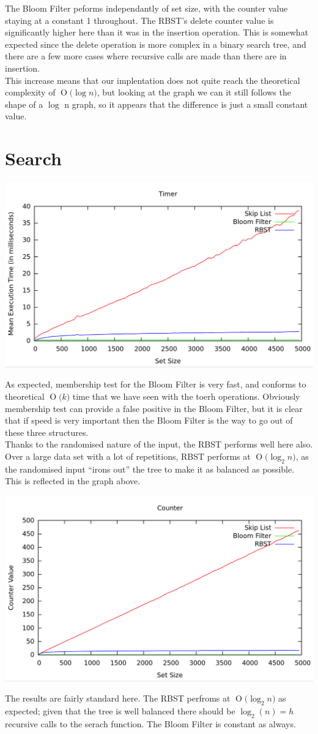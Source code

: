 \documentclass[11pt, notitlepage]{report}
\newcommand{\BigO}[1]{\ensuremath{\operatorname{O}\bigl(#1\bigr)}}
\begin{document}
The Bloom Filter peforms independantly of set size, with the counter value staying at a constant 1 throughout. The RBST's delete counter value is significantly higher here than it was in the insertion operation. This is somewhat expected since the delete operation is more complex in a binary search tree, and there are a few more cases where recursive calls are made than there are in insertion.\\

This increase means that our implentation does not quite reach the theoretical complexity of \BigO{\log n}, but looking at the graph we can it still follows the shape of a $\log$ n graph, so it appears that the difference is just a small constant value.

\section*{Search}

\includegraphics[width=\linewidth]{img/Timer-Find}

As expected, membership test for the Bloom Filter is very fast, and conforms to theoretical \BigO{k} time that we have seen with the toerh operations. Obviously membership test can provide a false positive in the Bloom Filter, but it is clear that if speed is very important then the Bloom Filter is the way to go out of these three structures.\\

Thanks to the randomised nature of the input, the RBST performs well here also. Over a large data set with a lot of repetitions, RBST performs at \BigO{\log_2 n}, as the randomised input ``irons out'' the tree to make it as balanced as possible. This is reflected in the graph above.

\includegraphics[width=\linewidth]{img/Counter-Find}

The results are fairly standard here. The RBST perfroms at \BigO{\log_2 n} as expected; given that the tree is well balanced there should be $\log_2(n) = h$ recursive calls to the serach function. The Bloom Filter is constant as always.
\end{document}

